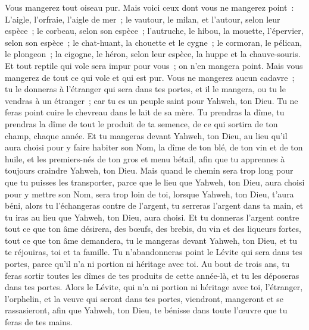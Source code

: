 \begin{multicols}{2}
Vous mangerez tout oiseau pur.
Mais voici ceux dont vous ne mangerez point~: L'aigle, l'orfraie, l'aigle de mer~;
le vautour, le milan, et l'autour, selon leur espèce~;
le corbeau, selon son espèce~;
l'autruche, le hibou, la mouette, l'épervier, selon son espèce~;
le chat-huant, la chouette et le cygne~;
le cormoran, le pélican, le plongeon~;
la cigogne, le héron, selon leur espèce, la huppe et la chauve-souris.
Et tout reptile qui vole sera impur pour vous~; on n'en mangera point.
Mais vous mangerez de tout ce qui vole et qui est pur.
Vous ne mangerez aucun cadavre~; tu le donneras à l'étranger qui sera dans tes portes, et il le mangera, ou tu le vendras à un étranger~; car tu es un peuple saint pour Yahweh, ton Dieu. Tu ne feras point cuire le chevreau dans le lait de sa mère.
Tu prendras la dîme, tu prendras la dîme de tout le produit de ta semence, de ce qui sortira de ton champ, chaque année.
Et tu mangeras devant Yahweh, ton Dieu, au lieu qu'il aura choisi pour y faire habiter son Nom, la dîme de ton blé, de ton vin et de ton huile, et les premiers-nés de ton gros et menu bétail, afin que tu apprennes à toujours craindre Yahweh, ton Dieu.
Mais quand le chemin sera trop long pour que tu puisses les transporter, parce que le lieu que Yahweh, ton Dieu, aura choisi pour y mettre son Nom, sera trop loin de toi, lorsque Yahweh, ton Dieu, t'aura béni,
alors tu l'échangeras contre de l'argent, tu serreras l'argent dans ta main, et tu iras au lieu que Yahweh, ton Dieu, aura choisi.
Et tu donneras l'argent contre tout ce que ton âme désirera, des bœufs, des brebis, du vin et des liqueurs fortes, tout ce que ton âme demandera, tu le mangeras devant Yahweh, ton Dieu, et tu te réjouiras, toi et ta famille.
Tu n'abandonneras point le Lévite qui sera dans tes portes, parce qu'il n'a ni portion ni héritage avec toi.
Au bout de trois ans, tu feras sortir toutes les dîmes de tes produits de cette année-là, et tu les déposeras dans tes portes.
Alors le Lévite, qui n'a ni portion ni héritage avec toi, l'étranger, l'orphelin, et la veuve qui seront dans tes portes, viendront, mangeront et se rassasieront, afin que Yahweh, ton Dieu, te bénisse dans toute l'œuvre que tu feras de tes mains.

\end{multicols}
